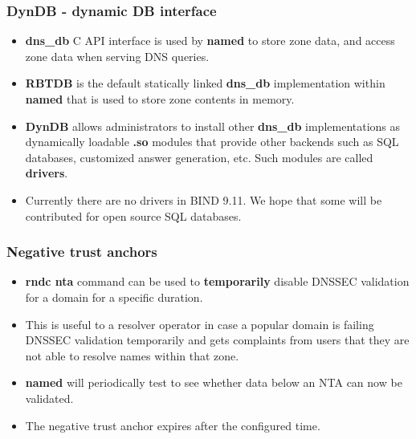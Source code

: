 \documentclass[aspectratio=169,14pt]{beamer}
\begin{document}
\frame
{
  \frametitle{DynDB - dynamic DB interface}

  \begin{itemize}

  \item \textbf{dns\_db} C API interface is used by \textbf{named} to
    store zone data, and access zone data when serving DNS queries.

  \item \textbf{RBTDB} is the default statically linked \textbf{dns\_db}
    implementation within \textbf{named} that is used to store zone
    contents in memory.

  \item \textbf{DynDB} allows administrators to install other
    \textbf{dns\_db} implementations as dynamically loadable
    \textbf{.so} modules that provide other backends such as SQL
    databases, customized answer generation, etc. Such modules are
    called \textbf{drivers}.

  \item Currently there are no drivers in BIND 9.11. We hope that some
    will be contributed for open source SQL databases.

  \end{itemize}
}

\frame
{
  \frametitle{Negative trust anchors}

  \begin{itemize}

    \item \textbf{rndc nta} command can be used to \textbf{temporarily}
      disable DNSSEC validation for a domain for a specific duration.

    \item This is useful to a resolver operator in case a popular domain
      is failing DNSSEC validation temporarily and gets complaints from
      users that they are not able to resolve names within that zone.

    \item \textbf{named} will periodically test to see whether data
      below an NTA can now be validated.

    \item The negative trust anchor expires after the configured time.

  \end{itemize}
}
\end{document}
